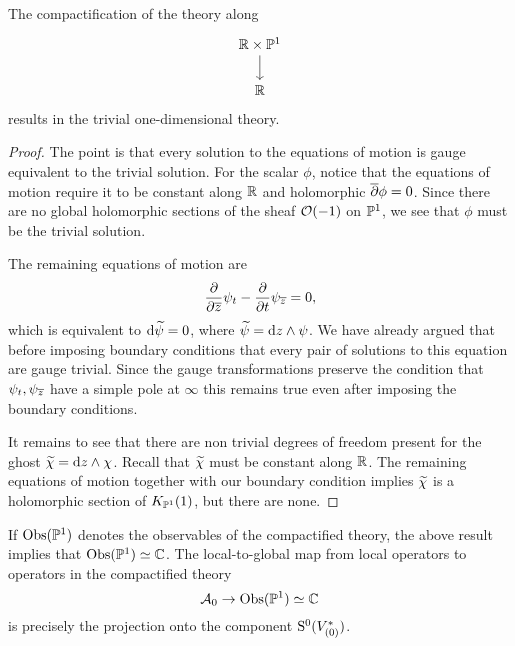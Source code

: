 \documentclass[11pt]{amsart}
\begin{document}
\begin{lem}\label{lem:compactP1}
The compactification of the theory along 
\[
\begin{tikzcd}
\RR \times \PP^1 \ar[d] \\ \RR
\end{tikzcd}
\]
results in the trivial one-dimensional theory. 
\end{lem}
\begin{proof}
The point is that every solution to the equations of motion is gauge equivalent to the trivial solution. 
For the scalar $\phi$, notice that the equations of motion require it to be constant along $\mathbb R$ and holomorphic $\overline{\partial} \phi = 0$. 
Since there are no global holomorphic sections of the sheaf $\mathcal O(-1)$ on $\mathbb P^1$, we see that $\phi$ must be the trivial solution. 

The remaining equations of motion are
\[
\frac{\partial}{\partial {\overline{z}}} \psi_t - \frac{\partial}{\partial t} \psi_{\overline{z}} = 0 ,
\]
which is equivalent to ${\rm d} \widetilde \psi = 0$, where $\widetilde \psi = {\rm d} z \wedge \psi$. 
We have already argued that before imposing boundary conditions that every pair of solutions to this equation are gauge trivial. 
Since the gauge transformations preserve the condition that $\psi_t, \psi_{{\overline{z}}}$ have a simple pole at $\infty$ this remains true even after imposing the boundary conditions. 

It remains to see that there are non trivial degrees of freedom present for the ghost $\widetilde\chi = {\rm d} z \wedge \chi$. 
Recall that $\widetilde\chi$ must be constant along $\mathbb R$.
The remaining equations of motion together with our boundary condition implies $\widetilde \chi$ is a holomorphic section of $K_{\mathbb P^1}(1)$, but there are none. 
\end{proof}

If ${\rm Obs}(\mathbb P^1)$ denotes the observables of the compactified theory, the above result implies that ${\rm Obs}(\mathbb P^1) \simeq \mathbb C$. 
The local-to-global map from local operators to operators in the compactified theory
\[
\mathcal A_0 \to {\rm Obs}(\mathbb P^1) \simeq \mathbb C
\]
is precisely the projection onto the component ${\rm S}^0(V^*_{(0)})$. 

\end{document}
